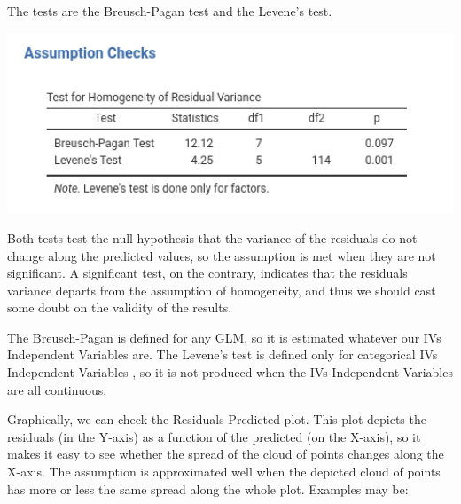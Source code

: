 \documentclass[
]{book}
\begin{document}
The tests are the Breusch-Pagan test and the Levene's test.

\includegraphics[width=6.6in]{bookletpics/2_assumptions_output1}

Both tests test the null-hypothesis that the variance of the residuals do not change along the predicted values, so the assumption is met when they are not significant. A significant test, on the contrary, indicates that the residuals variance departs from the assumption of homogeneity, and thus we should cast some doubt on the validity of the results.

The Breusch-Pagan is defined for any GLM, so it is estimated whatever our {IVs {Independent Variables} } are. The Levene's test is defined only for categorical {IVs {Independent Variables} }, so it is not produced when the {IVs {Independent Variables} } are all continuous.

Graphically, we can check the {Residuals-Predicted plot}. This plot depicts the residuals (in the Y-axis) as a function of the predicted (on the X-axis), so it makes it easy to see whether the spread of the cloud of points changes along the X-axis. The assumption is approximated well when the depicted cloud of points has more or less the same spread along the whole plot. Examples may be:
\end{document}
